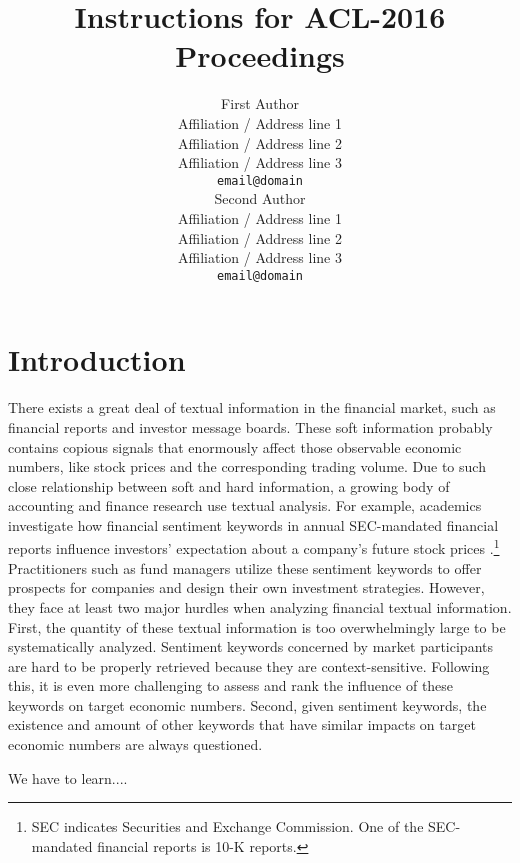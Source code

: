 \documentclass[11pt]{article}
\title{Instructions for ACL-2016 Proceedings}
\author{First Author \\
  Affiliation / Address line 1 \\
  Affiliation / Address line 2 \\
  Affiliation / Address line 3 \\
  {\tt email@domain} \\\And
  Second Author \\
  Affiliation / Address line 1 \\
  Affiliation / Address line 2 \\
  Affiliation / Address line 3 \\
  {\tt email@domain} \\}
\date{}
\begin{document}
\maketitle
\begin{abstract}
\end{abstract}


\section{Introduction}
There exists a great deal of textual information in the financial market, such as financial reports and investor message boards.
These soft information probably contains copious signals that enormously affect those observable economic numbers,
like stock prices and the corresponding trading volume.
Due to such close relationship between soft and hard information,
a growing body of accounting and finance research use textual analysis.
For example, academics investigate how financial sentiment keywords in annual SEC-mandated financial reports
influence investors' expectation about a company's future stock prices \cite{loughran2011liability}.\footnote{SEC indicates Securities and Exchange Commission.
One of the SEC-mandated financial reports is 10-K reports.}
Practitioners such as fund managers utilize these sentiment keywords to offer prospects for companies and design their own investment strategies.
However, they face at least two major hurdles when analyzing financial textual information.
First,
the quantity of these textual information is too overwhelmingly large to be systematically analyzed.
Sentiment keywords concerned by market participants are hard to be properly retrieved because they are context-sensitive.
Following this, it is even more challenging to assess and rank the influence of these keywords on target economic numbers.
Second,
given sentiment keywords, the existence and amount of other keywords that have similar impacts on target economic numbers are always questioned.


We have to learn....
\end{document}
